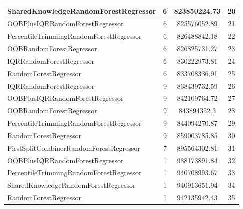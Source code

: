 \begin{table}[h]
\begin{tabular}{|l|c|c|c|}
\textcolor[HTML]{ef9b20}{SharedKnowledgeRandomForestRegressor} & 6 & 823850224.73 & 20 \\ \hline
\textcolor[HTML]{ede15b}{OOBPlusIQRRandomForestRegressor} & 6 & 825576052.89 & 21 \\ \hline
\textcolor[HTML]{f46a9b}{PercentileTrimmingRandomForestRegressor} & 6 & 826488842.18 & 22 \\ \hline
\textcolor[HTML]{b33dc6}{OOBRandomForestRegressor} & 6 & 826825731.27 & 23 \\ \hline
\textcolor[HTML]{27aeef}{IQRRandomForestRegressor} & 6 & 830222973.81 & 24 \\ \hline
\textcolor[HTML]{87bc45}{RandomForestRegressor} & 6 & 833708336.91 & 25 \\ \hline
\textcolor[HTML]{27aeef}{IQRRandomForestRegressor} & 9 & 838439732.59 & 26 \\ \hline
\textcolor[HTML]{ede15b}{OOBPlusIQRRandomForestRegressor} & 9 & 842109764.72 & 27 \\ \hline
\textcolor[HTML]{b33dc6}{OOBRandomForestRegressor} & 9 & 843894352.3 & 28 \\ \hline
\textcolor[HTML]{f46a9b}{PercentileTrimmingRandomForestRegressor} & 9 & 844094270.87 & 29 \\ \hline
\textcolor[HTML]{87bc45}{RandomForestRegressor} & 9 & 859003785.85 & 30 \\ \hline
\textcolor[HTML]{ea5545}{FirstSplitCombinerRandomForestRegressor} & 7 & 895564302.81 & 31 \\ \hline
\textcolor[HTML]{ede15b}{OOBPlusIQRRandomForestRegressor} & 1 & 938173891.84 & 32 \\ \hline
\textcolor[HTML]{f46a9b}{PercentileTrimmingRandomForestRegressor} & 1 & 940708993.67 & 33 \\ \hline
\textcolor[HTML]{ef9b20}{SharedKnowledgeRandomForestRegressor} & 1 & 940913651.94 & 34 \\ \hline
\textcolor[HTML]{87bc45}{RandomForestRegressor} & 1 & 942135942.43 & 35 \\ \hline
\end{tabular}
\end{table}

